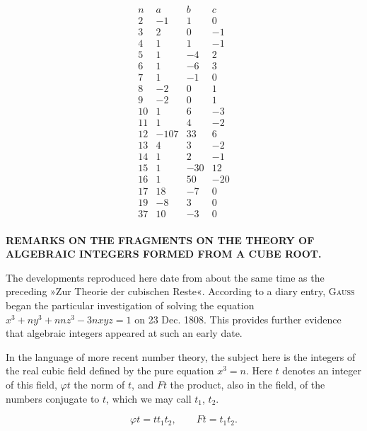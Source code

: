 \[
\begin{array}{r|rrr}
n & a & b & c \\
\hline
2 & -1 & 1 & 0 \\
3 & 2 & 0 & -1 \\
4 & 1 & 1 & -1 \\
5 & 1 & -4 & 2 \\
6 & 1 & -6 & 3 \\
7 & 1 & -1 & 0 \\
8 & -2 & 0 & 1 \\
9 & -2 & 0 & 1 \\
10 & 1 & 6 & -3 \\
11 & 1 & 4 & -2 \\
12 & -107 & 33 & 6 \\
13 & 4 & 3 & -2 \\
14 & 1 & 2 & -1 \\
15 & 1 & -30 & 12 \\
16 & 1 & 50 & -20 \\
17 & 18 & -7 & 0 \\
19 & -8 & 3 & 0 \\
37 & 10 & -3 & 0 \\
\end{array}
\]

\begingroup\small

\begin{center}\textbf{REMARKS ON THE FRAGMENTS ON THE THEORY OF ALGEBRAIC INTEGERS
FORMED FROM A CUBE ROOT.}\end{center}\par\noindent\hspace*{\parindent}The developments reproduced here date from about the same time as
the preceding »Zur Theorie der cubischen Reste«. According to a
diary entry, \textsc{Gauss} began the particular investigation of solving the
equation $x^3+ny^3+nnz^3-3nxyz=1$ on 23 Dec. 1808. This provides
further evidence that algebraic integers appeared at such an early
date.

In the language of more recent number theory, the subject here is the integers
of the real cubic field defined by the pure equation $x^3=n$.
Here $t$ denotes an integer of this field, $\varphi t$ the
norm of $t$, and $Ft$ the product, also in the field, of the numbers conjugate to
$t$, which we may call $t_1$, $t_2$.

\[
\varphi t = t t_1 t_2, \qquad Ft = t_1 t_2.
\]
